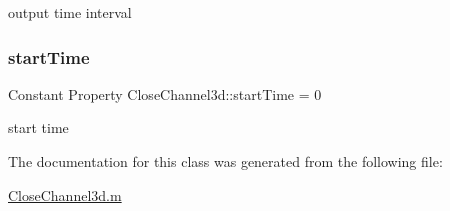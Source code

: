 output time interval 

\mbox{\label{class_close_channel3d_a780cac3d00d2aa244b7f914269c4a267}} 
\subsubsection{\texorpdfstring{start\+Time}{startTime}}
{\footnotesize\ttfamily Constant Property Close\+Channel3d\+::start\+Time = 0}



start time 



The documentation for this class was generated from the following file\+:\begin{DoxyCompactItemize}
\item 
\hyperlink{_close_channel3d_8m}{Close\+Channel3d.\+m}\end{DoxyCompactItemize}
